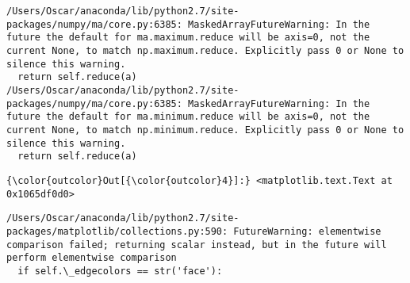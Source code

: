 \documentclass[11pt]{article}
\begin{document}
    \begin{Verbatim}[commandchars=\\\{\}]
/Users/Oscar/anaconda/lib/python2.7/site-packages/numpy/ma/core.py:6385: MaskedArrayFutureWarning: In the future the default for ma.maximum.reduce will be axis=0, not the current None, to match np.maximum.reduce. Explicitly pass 0 or None to silence this warning.
  return self.reduce(a)
/Users/Oscar/anaconda/lib/python2.7/site-packages/numpy/ma/core.py:6385: MaskedArrayFutureWarning: In the future the default for ma.minimum.reduce will be axis=0, not the current None, to match np.minimum.reduce. Explicitly pass 0 or None to silence this warning.
  return self.reduce(a)

    \end{Verbatim}

\begin{Verbatim}[commandchars=\\\{\}]
{\color{outcolor}Out[{\color{outcolor}4}]:} <matplotlib.text.Text at 0x1065df0d0>
\end{Verbatim}
            
    \begin{Verbatim}[commandchars=\\\{\}]
/Users/Oscar/anaconda/lib/python2.7/site-packages/matplotlib/collections.py:590: FutureWarning: elementwise comparison failed; returning scalar instead, but in the future will perform elementwise comparison
  if self.\_edgecolors == str('face'):

    \end{Verbatim}

    \begin{center}
    \end{center}
    { \hspace*{\fill} \\}
    
    \begin{center}
    \end{center}
    { \hspace*{\fill} \\}
    
\end{document}
